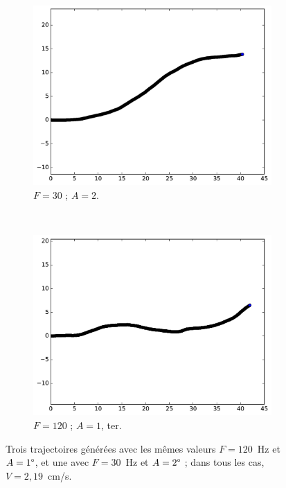 \begin{figure}[!htb]
\begin{subfigure}[t]{0.23\textwidth}
			\includegraphics[width=\textwidth]{figures/ch3/ac_2_19_2_30}
			\caption{$F=30$ ; $A=2$.}
			\label{fig:ac_2_30}
		\end{subfigure}		
		~
		\begin{subfigure}[t]{0.23\textwidth}
			\centering
			\includegraphics[width=\textwidth]{figures/ch3/ac_2_19_2_60}
			\caption{$F=120$ ; $A=1$, ter.}
			\label{fig:ac_1_120C}
		\end{subfigure}
		\caption[Mouvements pseudo-autocorrélés]{Trois trajectoires générées avec les mêmes valeurs $F = 120$~Hz et $A = 1\degree$, et une avec $F = 30$~Hz et $A = 2\degree$ ; dans tous les cas, $V = 2,19$~cm/s.}
		\label{fig:autocorr}
	\end{figure}
    
